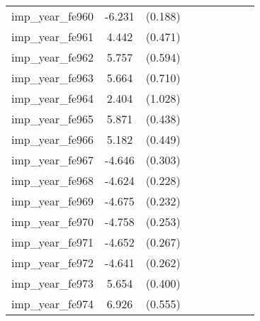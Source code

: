 {\begin{tabular}{l*{4}{cc}}
imp\_year\_fe960&   -6.231\sym{***}&  (0.188)&                  &         &                  &         &                  &         \\
imp\_year\_fe961&    4.442\sym{***}&  (0.471)&                  &         &                  &         &                  &         \\
imp\_year\_fe962&    5.757\sym{***}&  (0.594)&                  &         &                  &         &                  &         \\
imp\_year\_fe963&    5.664\sym{***}&  (0.710)&                  &         &                  &         &                  &         \\
imp\_year\_fe964&    2.404\sym{*}  &  (1.028)&                  &         &                  &         &                  &         \\
imp\_year\_fe965&    5.871\sym{***}&  (0.438)&                  &         &                  &         &                  &         \\
imp\_year\_fe966&    5.182\sym{***}&  (0.449)&                  &         &                  &         &                  &         \\
imp\_year\_fe967&   -4.646\sym{***}&  (0.303)&                  &         &                  &         &                  &         \\
imp\_year\_fe968&   -4.624\sym{***}&  (0.228)&                  &         &                  &         &                  &         \\
imp\_year\_fe969&   -4.675\sym{***}&  (0.232)&                  &         &                  &         &                  &         \\
imp\_year\_fe970&   -4.758\sym{***}&  (0.253)&                  &         &                  &         &                  &         \\
imp\_year\_fe971&   -4.652\sym{***}&  (0.267)&                  &         &                  &         &                  &         \\
imp\_year\_fe972&   -4.641\sym{***}&  (0.262)&                  &         &                  &         &                  &         \\
imp\_year\_fe973&    5.654\sym{***}&  (0.400)&                  &         &                  &         &                  &         \\
imp\_year\_fe974&    6.926\sym{***}&  (0.555)&                  &         &                  &         &                  &         \\

\end{tabular}}
